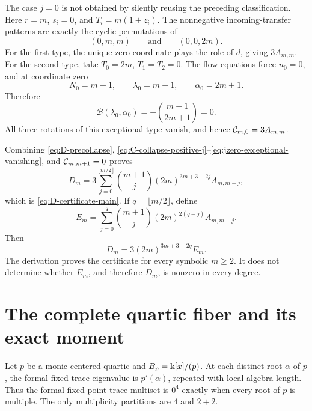 \documentclass[11pt]{article}
\theoremstyle{definition}
\theoremstyle{remark}
\begin{document}
The case \(j=0\) is not obtained by silently reusing the preceding
classification.  Here \(r=m\), \(s_i=0\), and
\(T_i=m(1+z_i)\).  The nonnegative incoming-transfer patterns are exactly
the cyclic permutations of
\begin{equation}
(0,m,m)
\qquad\text{and}\qquad
(0,0,2m).
\label{eq:jzero-patterns}
\end{equation}
For the first type, the unique zero coordinate plays the role of \(d\),
giving \(3A_{m,m}\).  For the second type, take
\(T_0=2m\), \(T_1=T_2=0\).  The flow equations force \(n_0=0\), and at
coordinate zero
\[
N_0=m+1,
\qquad
\lambda_0=m-1,
\qquad
\alpha_0=2m+1.
\]
Therefore
\begin{equation}
\mathcal{B}(\lambda_0,\alpha_0)
=-\binom{m-1}{2m+1}=0.
\label{eq:jzero-exceptional-vanishing}
\end{equation}
All three rotations of this exceptional type vanish, and hence
\(\mathcal{C}_{m,0}=3A_{m,m}\).

Combining \eqref{eq:D-precollapse},
\eqref{eq:C-collapse-positive-j}--\eqref{eq:jzero-exceptional-vanishing},
and \(\mathcal{C}_{m,m+1}=0\) proves
\begin{equation}
D_m=3\sum_{j=0}^{\lfloor m/2\rfloor}
\binom{m+1}{j}(2m)^{3m+3-2j}A_{m,m-j},
\label{eq:D-certificate-proved}
\end{equation}
which is \eqref{eq:D-certificate-main}.  If
\(q=\lfloor m/2\rfloor\), define
\begin{equation}
E_m=\sum_{j=0}^{q}\binom{m+1}{j}
(2m)^{2(q-j)}A_{m,m-j}.
\label{eq:E-definition}
\end{equation}
Then
\begin{equation}
D_m=3(2m)^{3m+3-2q}E_m.
\label{eq:D-factorization}
\end{equation}
The derivation proves the certificate for every symbolic \(m\ge2\).  It
does not determine whether \(E_m\), and therefore \(D_m\), is nonzero in
every degree.

\section{The complete quartic fiber and its exact moment}
\label{sec:quartic}

Let \(p\) be a monic-centered quartic and
\(B_p=\Bbbk[x]/(p)\).  At each distinct root \(\alpha\) of \(p\), the
formal fixed trace eigenvalue is \(p'(\alpha)\), repeated with local algebra
length.  Thus the formal fixed-point trace multiset is \(0^4\) exactly when
every root of \(p\) is multiple.  The only multiplicity partitions are
\(4\) and \(2+2\).
\end{document}
